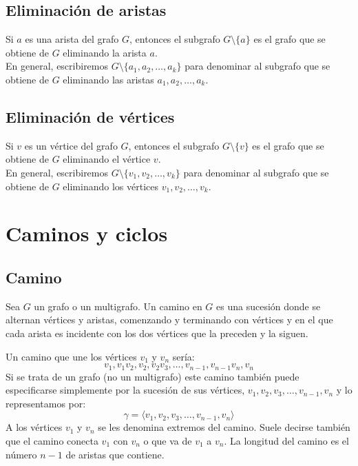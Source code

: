 \subsection{Eliminación de aristas}

\begin{fondo}
Si $a$ es una arista del grafo $G$, entonces el subgrafo $G \setminus \{a\}$ es el grafo que se obtiene de $G$ eliminando la arista $a$.\\
En general, escribiremos $G \setminus \{a_1,a_2, \ldots, a_k\}$ para denominar al subgrafo que se obtiene de $G$ eliminando las aristas $a_1,a_2, \ldots, a_k$.
\end{fondo}

\subsection{Eliminación de vértices}

\begin{fondo}
Si $v$ es un vértice del grafo $G$, entonces el subgrafo $G \setminus \{v\}$ es el grafo que se obtiene de $G$ eliminando el vértice $v$.\\
En general, escribiremos $G \setminus \{v_1,v_2, \ldots, v_k\}$ para denominar al subgrafo que se obtiene de $G$ eliminando los vértices $v_1,v_2, \ldots, v_k$.
\end{fondo}

\section{Caminos y ciclos}

\subsection{Camino}

\begin{fondo}
Sea $G$ un grafo o un multigrafo. Un camino en $G$ es una sucesión donde se alternan vértices y aristas, comenzando y terminando con vértices y en el que cada arista es incidente con los dos vértices que la preceden y la siguen.
\end{fondo}

Un camino que une los vértices $v_1$ y $v_n$ sería:\\
\[v_1, v_1v_2, v_2, v_2v_3, \ldots, v_{n-1}, v_{n-1}v_n, v_n \]
Si se trata de un grafo (no un multigrafo) este camino también puede especificarse simplemente por la sucesión de sus vértices, $v_1, v_2, v_3, \ldots, v_{n-1}, v_n$ y lo representamos por:\\
\[ \gamma = \langle v_1, v_2, v_3, \ldots, v_{n-1}, v_n \rangle \]
A los vértices $v_1$ y $v_n$ se les denomina extremos del camino. Suele decirse también que el camino conecta $v_1$ con $v_n$ o que va de $v_1$ a $v_n$. La longitud del camino es el número $n-1$ de aristas que contiene.

